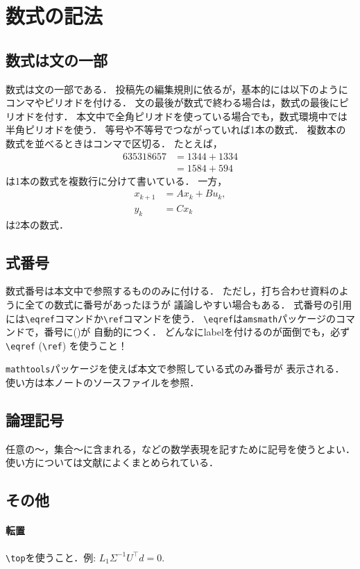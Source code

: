\documentclass[a4paper,10pt,twocolumn,dvipdfmx]{jsarticle}
\theoremstyle{definition}
\begin{document}
\section{数式の記法}\label{sec:eq}

\subsection{数式は文の一部}
数式は文の一部である．
投稿先の編集規則に依るが，基本的には以下のようにコンマやピリオドを付ける．
文の最後が数式で終わる場合は，数式の最後にピリオドを付す．
本文中で全角ピリオドを使っている場合でも，数式環境中では半角ピリオドを使う．
等号や不等号でつながっていれば1本の数式．
複数本の数式を並べるときはコンマで区切る．
たとえば，
\begin{align}
 635318657 &= 1344 + 1334\\
   &= 1584 + 594
\end{align}
は1本の数式を複数行に分けて書いている．
一方，
\begin{align}
 x_{k+1} &= Ax_k + Bu_k,\\
 y_k &= Cx_k
\end{align}
は2本の数式．

\subsection{式番号}
数式番号は本文中で参照するもののみに付ける．
ただし，打ち合わせ資料のように全ての数式に番号があったほうが
議論しやすい場合もある．
式番号の引用には\verb!\eqref!コマンドか\verb!\ref!コマンドを使う．
\verb!\eqref!は\texttt{amsmath}パッケージのコマンドで，番号に()が
自動的につく．
どんなにlabelを付けるのが面倒でも，必ず\verb!\eqref! (\verb!\ref!)
を使うこと！

\texttt{mathtools}パッケージを使えば本文で参照している式のみ番号が
表示される．
使い方は本ノートのソースファイルを参照．

\subsection{論理記号}
任意の〜，集合〜に含まれる，などの数学表現を記すために記号を使うとよい．
使い方については文献\cite{logic}によくまとめられている．

\subsection{その他}
\paragraph{転置} \verb!\top!を使うこと．例: $L_1\Sigma^{-1}U^\top d = 0$.
\end{document}
